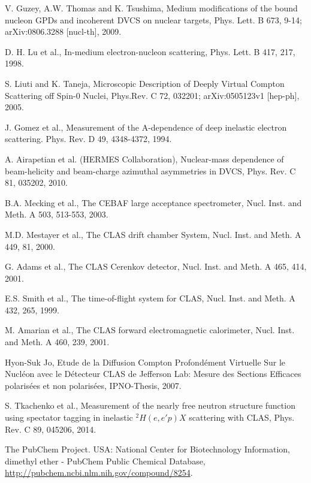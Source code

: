 \begin{thebibliography}{99}
V. Guzey, A.W. Thomas and K. Tsushima, Medium modifications of the bound nucleon GPDs and incoherent DVCS on nuclear targets, Phys. Lett. B 673, 9-14; arXiv:0806.3288 [nucl-th], 2009. 
 

D. H. Lu et al., In-medium electron-nucleon scattering, Phys. Lett. B 417, 217, 1998.

S. Liuti and K. Taneja, Microscopic Description of Deeply Virtual Compton Scattering off Spin-0 Nuclei, Phys.Rev. C 72, 032201; arXiv:0505123v1 [hep-ph], 2005.

J. Gomez et al., Measurement of the A-dependence of deep inelastic electron
scattering. Phys. Rev. D 49, 4348-4372, 1994.

A. Airapetian et al. (HERMES Collaboration), Nuclear-mass dependence of beam-helicity and beam-charge azimuthal asymmetries in DVCS, Phys. Rev. C 81, 035202, 2010.


B.A. Mecking et al., The CEBAF large acceptance spectrometer, Nucl. Inst. and Meth. A 503, 513-553, 2003.


M.D. Mestayer et al., The CLAS drift chamber System, Nucl. Inst. and Meth. A 449, 81, 2000.

G. Adams et al., The CLAS Cerenkov detector, Nucl. Inst. and Meth. A 465, 414, 2001.

   E.S. Smith et al., The time-of-flight system for CLAS, Nucl. Inst. and Meth.  
   A 432, 265, 1999.

   M. Amarian et al., The CLAS forward electromagnetic calorimeter, Nucl. Inst.  
   and Meth. A 460, 239, 2001.



Hyon-Suk Jo, Etude de la Diffusion Compton Profond{\'e}ment Virtuelle Sur le Nucl{\'e}on avec le D{\'e}tecteur CLAS de Jefferson Lab: Mesure des Sections Efficaces polaris{\'e}es et non polaris{\'e}es, IPNO-Thesis, 2007. 


S. Tkachenko et al., Measurement of the nearly free neutron structure function using spectator tagging in inelastic $^{2}H(e,e'p)X$ scattering with CLAS, Phys. Rev. C 89, 045206, 2014.

The PubChem Project. USA: National Center for Biotechnology Information, dimethyl ether - PubChem Public Chemical Database,  \url{http://pubchem.ncbi.nlm.nih.gov/compound/8254}. 


\end{thebibliography}
